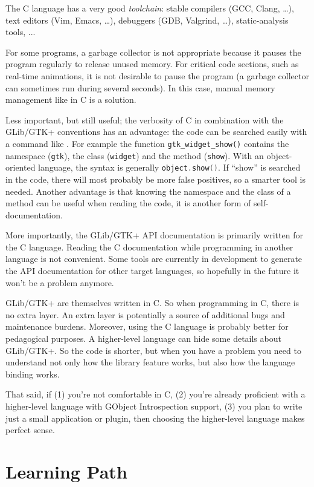 The C language has a very good \emph{toolchain}: stable compilers (GCC, Clang, …), text editors (Vim, Emacs, …), debuggers (GDB, Valgrind, …), static-analysis tools, ...

For some programs, a garbage collector is not appropriate because it pauses the program regularly to release unused memory. For critical code sections, such as real-time animations, it is not desirable to pause the program (a garbage collector can sometimes run during several seconds). In this case, manual memory management like in C is a solution.

Less important, but still useful; the verbosity of C in combination with the GLib/GTK+ conventions has an advantage: the code can be searched easily with a command like . For example the function \lstinline{gtk_widget_show()} contains the namespace (\lstinline{gtk}), the class (\lstinline{widget}) and the method (\lstinline{show}). With an object-oriented language, the syntax is generally \lstinline[language=C++]{object.show()}. If ``show'' is searched in the code, there will most probably be more false positives, so a smarter tool is needed. Another advantage is that knowing the namespace and the class of a method can be useful when reading the code, it is another form of self-documentation.

More importantly, the GLib/GTK+ API documentation is primarily written for the C language. Reading the C documentation while programming in another language is not convenient. Some tools are currently in development to generate the API documentation for other target languages, so hopefully in the future it won't be a problem anymore.

GLib/GTK+ are themselves written in C. So when programming in C, there is no extra layer. An extra layer is potentially a source of additional bugs and maintenance burdens. Moreover, using the C language is probably better for pedagogical purposes. A higher-level language can hide some details about GLib/GTK+. So the code is shorter, but when you have a problem you need to understand not only how the library feature works, but also how the language binding works.

That said, if (1) you're not comfortable in C, (2) you're already proficient with a higher-level language with GObject Introspection support, (3) you plan to write just a small application or plugin, then choosing the higher-level language makes perfect sense.

\section{Learning Path}
\label{intro-learning-path}

